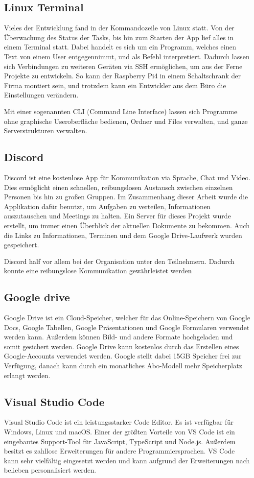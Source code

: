 \subsection{Linux Terminal}
Vieles der Entwicklung fand in der Kommandozeile von Linux statt. Von der Überwachung des Status der Tasks, bis hin zum Starten der App lief alles in einem Terminal statt. Dabei handelt es sich um ein Programm, welches einen Text von einem User entgegennimmt, und als Befehl interpretiert. Dadurch lassen sich Verbindungen zu weiteren Geräten via SSH ermöglichen, um aus der Ferne Projekte zu entwickeln. So kann der Raspberry Pi4 in einem Schaltschrank der Firma montiert sein, und trotzdem kann ein Entwickler aus dem Büro die Einstellungen verändern.   

Mit einer sogenannten CLI (Command Line Interface) lassen sich Programme ohne graphische Useroberfläche bedienen, Ordner und Files verwalten, und ganze Serverstrukturen verwalten. 
\subsection{Discord}
Discord ist eine kostenlose App für Kommunikation via Sprache, Chat und Video. Dies ermöglicht einen schnellen, reibungslosen Austausch zwischen einzelnen Personen bis hin zu großen Gruppen. Im Zusammenhang dieser Arbeit wurde die Applikation dafür benutzt, um Aufgaben zu verteilen, Informationen auszutauschen und Meetings zu halten. Ein Server für dieses Projekt wurde erstellt, um immer einen Überblick der aktuellen Dokumente zu bekommen. Auch die Links zu Informationen, Terminen und dem Google Drive-Laufwerk wurden gespeichert.   

Discord half vor allem bei der Organisation unter den Teilnehmern. Dadurch konnte eine reibungslose Kommunikation gewährleistet werden  
\subsection{Google drive}
Google Drive ist ein Cloud-Speicher, welcher für das Online-Speichern von Google Docs, Google Tabellen, Google Präsentationen und Google Formularen verwendet werden kann. Außerdem können Bild- und andere Formate hochgeladen und somit gesichert werden. Google Drive kann kostenlos durch das Erstellen eines Google-Accounts verwendet werden. Google stellt dabei 15GB Speicher frei zur Verfügung, danach kann durch ein monatliches Abo-Modell mehr Speicherplatz erlangt werden. 
 
\subsection{Visual Studio Code}
Visual Studio Code ist ein leistungsstarker Code Editor. Es ist verfügbar für Windows, Linux und macOS. 
Einer der größten Vorteile von VS Code ist ein eingebautes Support-Tool für JavaScript, TypeScript und Node.js. Außerdem besitzt es zahllose Erweiterungen für andere Programmiersprachen. VS Code kann sehr vielfältig eingesetzt werden und kann aufgrund der Erweiterungen nach belieben personalisiert werden. 
 
